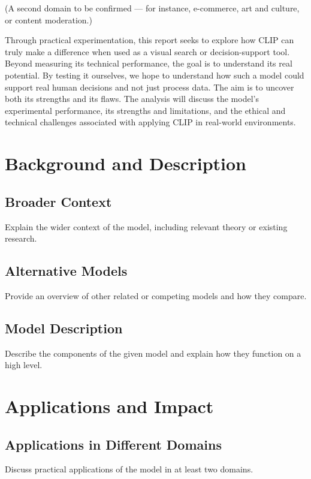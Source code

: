 \documentclass[12pt]{article}
\begin{document}
(A second domain to be confirmed — for instance, e-commerce, art and culture, or content moderation.)

Through practical experimentation, this report seeks to explore how CLIP can truly make a difference when used as a visual search or decision-support tool. Beyond measuring its technical performance, the goal is to understand its real potential. By testing it ourselves, we hope to understand how such a model could support real human decisions and not just process data. The aim is to uncover both its strengths and its flaws. The analysis will discuss the model’s experimental performance, its strengths and limitations, and the ethical and technical challenges associated with applying CLIP in real-world environments.

\section{Background and Description}

\subsection{Broader Context}
Explain the wider context of the model, including relevant theory or existing research.

\subsection{Alternative Models}
Provide an overview of other related or competing models and how they compare.

\subsection{Model Description}
Describe the components of the given model and explain how they function on a high level.

\section{Applications and Impact}

\subsection{Applications in Different Domains}
Discuss practical applications of the model in at least two domains.
\end{document}
